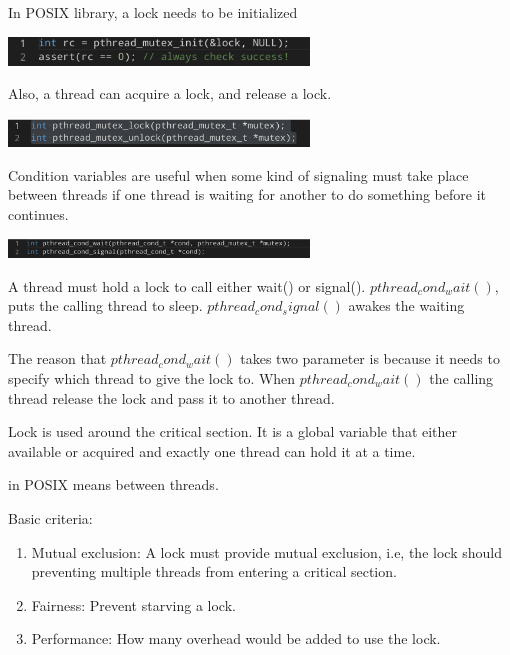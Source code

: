     In POSIX library, a lock needs to be initialized

    \includegraphics[width=0.6\textwidth]{chapters/Cucurrency/Cucurrency/init_lock.png}

    Also, a thread can acquire a lock, and release a lock.

    \includegraphics[width=0.6\textwidth]{chapters/Cucurrency/Cucurrency/lock_unlock.png}



    Condition variables are useful when some kind of signaling must take place
    between threads if one thread is waiting for another to do something before it 
    continues.

    \includegraphics[width=0.6\textwidth]{chapters/Cucurrency/Cucurrency/condtion_wait_signal.png}

    A thread must hold a lock to call either wait() or signal(). 
    $pthread_cond_wait()$, puts the calling thread to sleep.
    $pthread_cond_signal()$ awakes the waiting thread.

    The reason that $pthread_cond_wait()$ takes two parameter is because
    it needs to specify which thread to give the lock to. When $pthread_cond_wait()$
    the calling thread release the lock and pass it to another thread.



    Lock is used around the critical section. It is a global variable that either 
    available or acquired and exactly one thread can hold it at a time.

     in POSIX means  between threads.


    Basic criteria:
    \begin{enumerate}
        \item Mutual exclusion: A lock must provide mutual exclusion, i.e, the lock
        should preventing multiple threads from entering a critical section.
        \item Fairness: Prevent starving a lock.
        \item Performance: How many overhead would be added to use the lock.
    \end{enumerate}


